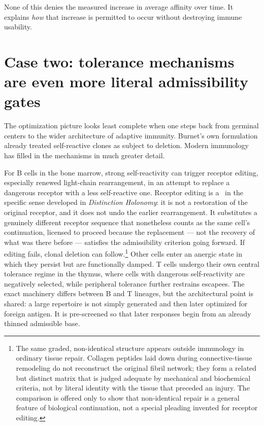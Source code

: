 \documentclass[11pt]{article}
\begin{document}
None of this denies the measured increase in average affinity over time. It explains \emph{how} that increase is permitted to occur without destroying immune usability.

\section{Case two: tolerance mechanisms are even more literal admissibility gates}
The optimization picture looks least complete when one steps back from germinal centers to the wider architecture of adaptive immunity. Burnet's own formulation already treated self-reactive clones as subject to deletion. Modern immunology has filled in the mechanisms in much greater detail.

For B cells in the bone marrow, strong self-reactivity can trigger receptor editing, especially renewed light-chain rearrangement, in an attempt to replace a dangerous receptor with a less self-reactive one. Receptor editing is a \repair\ in the specific sense developed in \textit{Distinction Holonomy}: it is not a restoration of the original receptor, and it does not undo the earlier rearrangement. It substitutes a genuinely different receptor sequence that nonetheless counts as the same cell's continuation, licensed to proceed because the replacement --- not the recovery of what was there before --- satisfies the admissibility criterion going forward. If editing fails, clonal deletion can follow.\footnote{The same graded, non-identical structure appears outside immunology in ordinary tissue repair. Collagen peptides laid down during connective-tissue remodeling do not reconstruct the original fibril network; they form a related but distinct matrix that is judged adequate by mechanical and biochemical criteria, not by literal identity with the tissue that preceded an injury. The comparison is offered only to show that non-identical repair is a general feature of biological continuation, not a special pleading invented for receptor editing.} Other cells enter an anergic state in which they persist but are functionally damped. T cells undergo their own central tolerance regime in the thymus, where cells with dangerous self-reactivity are negatively selected, while peripheral tolerance further restrains escapees. The exact machinery differs between B and T lineages, but the architectural point is shared: a large repertoire is not simply generated and then later optimized for foreign antigen. It is pre-screened so that later responses begin from an already thinned admissible base.
\end{document}
